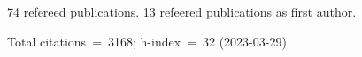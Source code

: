 74 refereed publications. 13 refeered publications as first author.

Total citations~=~3168; h-index~=~32 (2023-03-29)